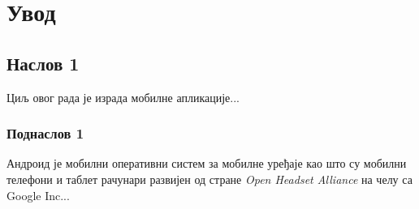 \chapter{Увод}

\section{Наслов 1}

Циљ овог рада је израда мобилне апликације...

\subsection{Поднаслов 1}

Андроид је мобилни оперативни систем за мобилне уређаје као што су мобилни телефони и таблет рачунари развијен од стране \textit{Open Headset Alliance} на челу са Google Inc...

